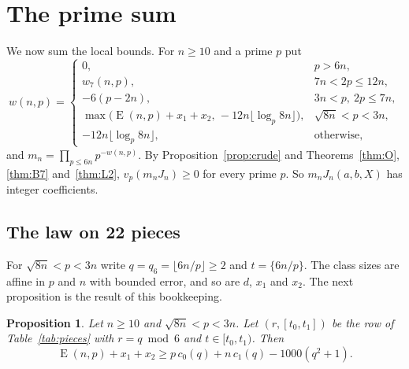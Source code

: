 \documentclass[11pt]{amsart}
\newtheorem{proposition}[theorem]{Proposition}
\theoremstyle{definition}
\theoremstyle{remark}
\numberwithin{equation}{section}
\newcommand{\fr}[1]{\{#1\}}
\newcommand{\Lex}{\operatorname{E}}
\begin{document}
\section{The prime sum}\label{sec:sum}

We now sum the local bounds. For $n\ge10$ and a prime $p$ put
\[
 w(n,p)=\begin{cases}0,&p>6n,\\ w_7(n,p),&7n<2p\le12n,\\ -6(p-2n),&3n<p,\ 2p\le7n,\\
 \max\bigl(\Lex(n,p)+x_1+x_2,\,-12n\lfloor\log_p8n\rfloor\bigr),&\sqrt{8n}<p<3n,\\ -12n\lfloor\log_p8n\rfloor,&\text{otherwise,}\end{cases}
\]
and $m_n=\prod_{p\le6n}p^{-w(n,p)}$. By Proposition~\ref{prop:crude} and Theorems~\ref{thm:O}, \ref{thm:B7}
and~\ref{thm:L2}, $v_p(m_nJ_n)\ge0$ for every prime $p$. So $m_nJ_n(a,b,X)$ has integer coefficients.

\subsection{The law on 22 pieces}
For $\sqrt{8n}<p<3n$ write $q=q_6=\lfloor6n/p\rfloor\ge2$ and $t=\fr{6n/p}$. The class sizes are affine in $p$ and
$n$ with bounded error, and so are $d$, $x_1$ and $x_2$. The next proposition is the result of this bookkeeping.

\begin{proposition}\label{prop:bridge}
Let $n\ge10$ and $\sqrt{8n}<p<3n$. Let $(r,[t_0,t_1])$ be the row of Table~\ref{tab:pieces} with $r=q\bmod6$ and
$t\in[t_0,t_1)$. Then
\[
 \Lex(n,p)+x_1+x_2\ge p\,c_0(q)+n\,c_1(q)-1000(q^2+1).
\]
\end{proposition}
\end{document}
